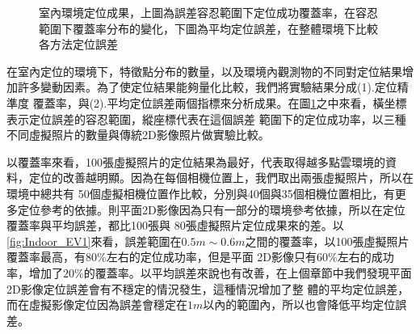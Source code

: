 \begin{figure}
	\begin{center}
	{
	}
	\end{center}
  \caption{室內環境定位成果，上圖為誤差容忍範圍下定位成功覆蓋率，在容忍範圍下覆蓋率分布的變化，下圖為平均定位誤差，在整體環境下比較各方法定位誤差}
  \label{fig:Indoor_EV_and_Query}	
\end{figure}	

		在室內定位的環境下，特徵點分布的數量，以及環境內觀測物的不同對定位結果增加許多變動因素。為了使定位結果能夠量化比較，我們將實驗結果分成(1).定位精準度
	覆蓋率，與(2).平均定位誤差兩個指標來分析成果。在圖\ref{fig:Indoor_EV_and_Query}之中來看，橫坐標表示定位誤差的容忍範圍，縱座標代表在這個誤差
	範圍下的定位成功率，以三種不同虛擬照片的數量與傳統2D影像照片做實驗比較。
	
		以覆蓋率來看，100張虛擬照片的定位結果為最好，代表取得越多點雲環境的資料，定位的改善越明顯。因為在每個相機位置上，我們取出兩張虛擬照片，所以在環境中總共有
	50個虛擬相機位置作比較，分別與40個與35個相機位置相比，有更多定位參考的依據。則平面2D影像因為只有一部分的環境參考依據，所以在定位覆蓋率與平均誤差，都比100張與
	80張虛擬照片定位成果來的差。以\ref{fig:Indoor_EV1}來看，誤差範圍在$0.5m \sim 0.6m$之間的覆蓋率，以100張虛擬照片覆蓋率最高，有$80\%$左右的定位成功率，但是平面
	2D影像只有$60\%$左右的成功率，增加了$20\%$的覆蓋率。以平均誤差來說也有改善，在上個章節中我們發現平面2D影像定位誤差會有不穩定的情況發生，這種情況增加了整
	體的平均定位誤差，而在虛擬影像定位因為誤差會穩定在$1m$以內的範圍內，所以也會降低平均定位誤差。
	
